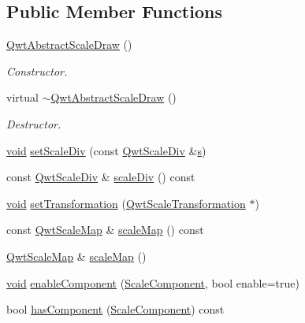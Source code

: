 \subsection*{Public Member Functions}
\begin{DoxyCompactItemize}
\item 
\hyperlink{class_qwt_abstract_scale_draw_a19c944664a2e36f06ae71b745fbd442e}{Qwt\-Abstract\-Scale\-Draw} ()
\begin{DoxyCompactList}\small\item\em Constructor. \end{DoxyCompactList}\item 
virtual \hyperlink{class_qwt_abstract_scale_draw_adc4d3f491b28ee39d728a4a4a9cdd494}{$\sim$\-Qwt\-Abstract\-Scale\-Draw} ()
\begin{DoxyCompactList}\small\item\em Destructor. \end{DoxyCompactList}\item 
\hyperlink{group___u_a_v_objects_plugin_ga444cf2ff3f0ecbe028adce838d373f5c}{void} \hyperlink{class_qwt_abstract_scale_draw_a4399aac94a294f5ed6c52114dde00d2f}{set\-Scale\-Div} (const \hyperlink{class_qwt_scale_div}{Qwt\-Scale\-Div} \&\hyperlink{glext_8h_ad585a1393cfa368fa9dc3d8ebff640d5}{s})
\item 
const \hyperlink{class_qwt_scale_div}{Qwt\-Scale\-Div} \& \hyperlink{class_qwt_abstract_scale_draw_a82510027cd5bee269628c9d6302a19a9}{scale\-Div} () const 
\item 
\hyperlink{group___u_a_v_objects_plugin_ga444cf2ff3f0ecbe028adce838d373f5c}{void} \hyperlink{class_qwt_abstract_scale_draw_a0011367eb32519070e6f276ac393dcfb}{set\-Transformation} (\hyperlink{class_qwt_scale_transformation}{Qwt\-Scale\-Transformation} $\ast$)
\item 
const \hyperlink{class_qwt_scale_map}{Qwt\-Scale\-Map} \& \hyperlink{class_qwt_abstract_scale_draw_aac87f593525666a47a57d9e2b4f02c66}{scale\-Map} () const 
\item 
\hyperlink{class_qwt_scale_map}{Qwt\-Scale\-Map} \& \hyperlink{class_qwt_abstract_scale_draw_ae7488eb63ad73a2e69acb29ff069c904}{scale\-Map} ()
\item 
\hyperlink{group___u_a_v_objects_plugin_ga444cf2ff3f0ecbe028adce838d373f5c}{void} \hyperlink{class_qwt_abstract_scale_draw_af975410588db6103f281e49d0b43c6a6}{enable\-Component} (\hyperlink{class_qwt_abstract_scale_draw_a26215d06a4d48adf401d0aa05d4193c5}{Scale\-Component}, bool enable=true)
\item 
bool \hyperlink{class_qwt_abstract_scale_draw_a95d74d9eaa5520754295efb33a4db50f}{has\-Component} (\hyperlink{class_qwt_abstract_scale_draw_a26215d06a4d48adf401d0aa05d4193c5}{Scale\-Component}) const 

\end{DoxyCompactItemize}

